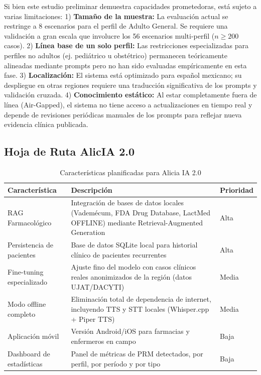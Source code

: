 \documentclass[12pt,a4paper]{article}
\begin{document}
Si bien este estudio preliminar demuestra capacidades prometedoras, está sujeto a varias limitaciones:
1) \textbf{Tamaño de la muestra:} La evaluación actual se restringe a 8 escenarios para el perfil de Adulto General. Se requiere una validación a gran escala que involucre los 56 escenarios multi-perfil ($n \geq 200$ casos).
2) \textbf{Línea base de un solo perfil:} Las restricciones especializadas para perfiles no adultos (ej. pediátrico u obstétrico) permanecen teóricamente alineadas mediante prompts pero no han sido evaluadas empíricamente en esta fase.
3) \textbf{Localización:} El sistema está optimizado para español mexicano; su despliegue en otras regiones requiere una traducción significativa de los prompts y validación cruzada.
4) \textbf{Conocimiento estático:} Al estar completamente fuera de línea (Air-Gapped), el sistema no tiene acceso a actualizaciones en tiempo real y depende de revisiones periódicas manuales de los prompts para reflejar nueva evidencia clínica publicada.

\subsection{Hoja de Ruta AlicIA 2.0}

\begin{table}[H]
  \centering
  \caption{Características planificadas para Alicia IA 2.0}
  \begin{tabularx}{\textwidth}{lXl}
    \toprule
    \textbf{Característica} & \textbf{Descripción} & \textbf{Prioridad} \\
    \midrule
    RAG Farmacológico & Integración de bases de datos locales (Vademécum, FDA Drug Database, LactMed OFFLINE) mediante Retrieval-Augmented Generation & Alta \\
    \midrule
    Persistencia de pacientes & Base de datos SQLite local para historial clínico de pacientes recurrentes & Alta \\
    \midrule
    Fine-tuning especializado & Ajuste fino del modelo con casos clínicos reales anonimizados de la región (datos UJAT/DACYTI) & Media \\
    \midrule
    Modo offline completo & Eliminación total de dependencia de internet, incluyendo TTS y STT locales (Whisper.cpp + Piper TTS) & Media \\
    \midrule
    Aplicación móvil & Versión Android/iOS para farmacias y enfermeros en campo & Baja \\
    \midrule
    Dashboard de estadísticas & Panel de métricas de PRM detectados, por perfil, por período y por tipo & Baja \\
    \bottomrule
  \end{tabularx}
\end{table}
\end{document}
